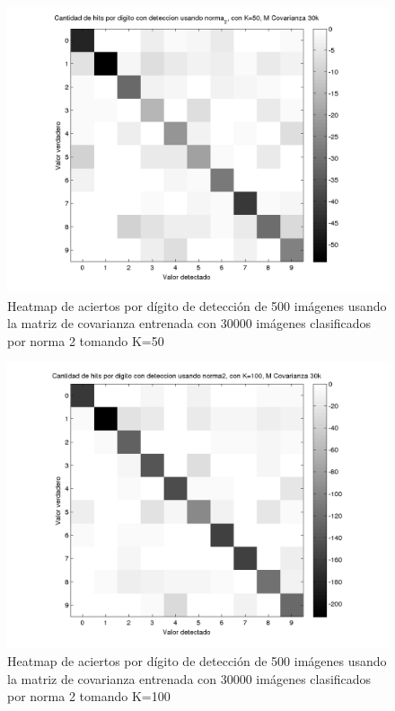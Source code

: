 \begin{figure}[H]
\includegraphics[width=\hmwidth]{plots/heatmap-30kcv-k50-norma_2.png}
\caption{Heatmap de aciertos por d\'igito de detecci\'on de 500 im\'agenes usando la matriz de covarianza entrenada con 30000 im\'agenes
clasificados por norma 2 tomando K=50 }
\label{fig:HM30kcv-k50}
\end{figure}

\begin{figure}[H]
\includegraphics[width=\hmwidth]{plots/heatmap-30kcv-k100-norma_2.png}
\caption{Heatmap de aciertos por d\'igito de detecci\'on de 500 im\'agenes usando la matriz de covarianza entrenada con 30000 im\'agenes
clasificados por norma 2 tomando K=100 }
\label{fig:HM30kcv-k100}
\end{figure}

